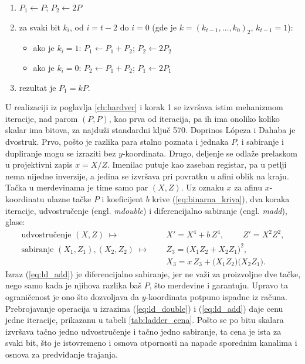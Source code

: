 \begin{enumerate}[itemsep=2pt, label=\arabic*.]
    \item $P_1 \gets P$; \quad $P_2 \gets 2P$
    \item za svaki bit $k_i$, od $i = t-2$ do $i = 0$ \quad (gde je $k = (k_{t-1}, \ldots, k_0)_2$, $k_{t-1} = 1$):
    \begin{itemize}[itemsep=2pt]
        \item ako je $k_i = 1$: \quad $P_1 \gets P_1 + P_2$; \quad $P_2 \gets 2P_2$
        \item ako je $k_i = 0$: \quad $P_2 \gets P_1 + P_2$; \quad $P_1 \gets 2P_1$
    \end{itemize}
    \item rezultat je $P_1 = kP$.
\end{enumerate}
U realizaciji iz poglavlja \ref{ch:hardver} i korak 1 se izvršava istim mehanizmom iteracije, nad parom $(P, P)$, kao prva od iteracija, pa ih ima onoliko koliko skalar ima bitova, za najduži standardni ključ 570.
\smallbreak
Doprinos Lópeza i Dahaba \cite{lopez_dahab} je dvostruk. Prvo, pošto je razlika para stalno poznata i jednaka $P$, i sabiranje i dupliranje mogu se izraziti bez $y$-koordinata. Drugo, deljenje se odlaže prelaskom u projektivni zapis $x = X/Z$. Imenilac putuje kao zaseban registar, pa u petlji nema nijedne inverzije, a jedina se izvršava pri povratku u afini oblik na kraju. Tačka u merdevinama je time samo par $(X, Z)$.
\smallbreak
Uz oznaku $x$ za afinu $x$-koordinatu ulazne tačke $P$ i koeficijent $b$ krive (\ref{eq:binarna_kriva}), dva koraka iteracije, udvostručenje (engl. \textit{mdouble}) i diferencijalno sabiranje (engl. \textit{madd}), glase:
\begin{align}
    \text{udvostručenje } (X, Z) \;\mapsto\; &\quad X' = X^4 + b\,Z^4, \qquad\; Z' = X^2 Z^2,
    \label{eq:ld_double}\\[4pt]
    \text{sabiranje } (X_1, Z_1), (X_2, Z_2) \;\mapsto\; &\quad Z_3 = \big(X_1 Z_2 + X_2 Z_1\big)^2, \nonumber\\
    &\quad X_3 = x\,Z_3 + \big(X_1 Z_2\big)\big(X_2 Z_1\big).
    \label{eq:ld_add}
\end{align}
Izraz (\ref{eq:ld_add}) je diferencijalno sabiranje, jer ne važi za proizvoljne dve tačke, nego samo kada je njihova razlika baš $P$, što merdevine i garantuju. Upravo ta ograničenost je ono što dozvoljava da $y$-koordinata potpuno ispadne iz računa.
\smallbreak
Prebrojavanje operacija u izrazima (\ref{eq:ld_double}) i (\ref{eq:ld_add}) daje cenu jedne iteracije, prikazanu u tabeli \ref{tab:ladder_cena}. Pošto se po bitu skalara izvršava tačno jedno udvostručenje i tačno jedno sabiranje, ta cena je ista za svaki bit, što je istovremeno i osnova otpornosti na napade sporednim kanalima i osnova za predviđanje trajanja.

